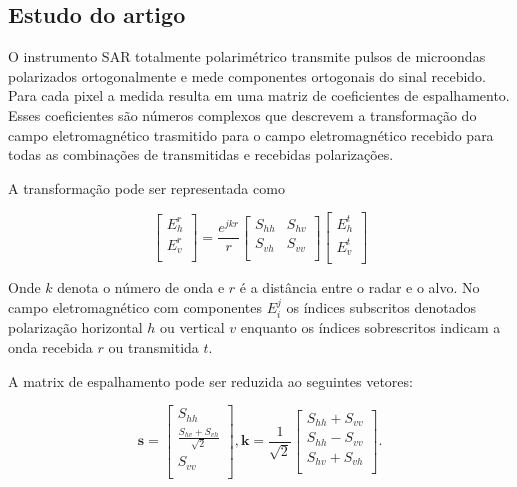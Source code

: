 \subsection{Estudo do artigo  \cite{ade}}

O instrumento SAR totalmente polarimétrico transmite pulsos de microondas polarizados ortogonalmente e mede componentes ortogonais do sinal recebido. Para cada pixel a medida resulta em uma matriz de coeficientes de espalhamento. Esses coeficientes são números complexos que descrevem a transformação do campo eletromagnético trasmitido para o campo eletromagnético recebido para todas as combinações de transmitidas e recebidas polarizações.

A transformação pode ser representada como

\begin{equation}\label{eqn88}
 \left[
\begin{array}{c}
	E_{h}^{r}   \\
	E_{v}^{r}    \\
\end{array}
\right]
 = \frac{e^{jkr}}{r}\left[
\begin{array}{cc}
	S_{hh}   & S_{hv}   \\
	S_{vh}   & S_{vv}   \\
\end{array}
\right]
 \left[
\begin{array}{c}
	E_{h}^{t}   \\
	E_{v}^{t}    \\
\end{array}
\right]
\end{equation}

Onde $k$ denota o número de onda e $r$ é a distância entre o radar e o alvo. No campo eletromagnético com componentes $E_{i}^{j}$ os índices subscritos denotados polarização horizontal $h$ ou vertical $v$ enquanto os índices sobrescritos indicam a onda recebida $r$ ou transmitida $t$.    


A matrix de espalhamento pode ser reduzida ao seguintes vetores:

\begin{equation}\label{eqn89}
\mathbf{s} = \left[
\begin{array}{c}
	S_{hh}      \\
	\frac{S_{hv}+S_{vh}}{\sqrt{2}}     \\
	S_{vv}      \\
\end{array}
\right],
\mathbf{k} =\frac{1}{\sqrt{2}} \left[
\begin{array}{c}
	S_{hh} + S_{vv}      \\
	S_{hh} - S_{vv}      \\
	S_{hv} + S_{vh}      \\
\end{array}
\right].
\end{equation}

